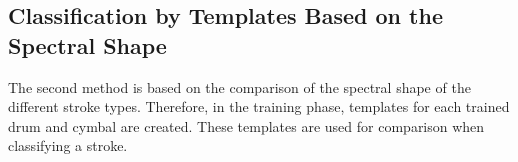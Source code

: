 \subsection{Classification by Templates Based on the Spectral Shape}
\label{section:method2}

The second method is based on the comparison of the spectral shape of the different stroke types. Therefore, in the training phase, templates for each trained drum and cymbal are created. These templates are used for comparison when classifying a stroke.

%
%


